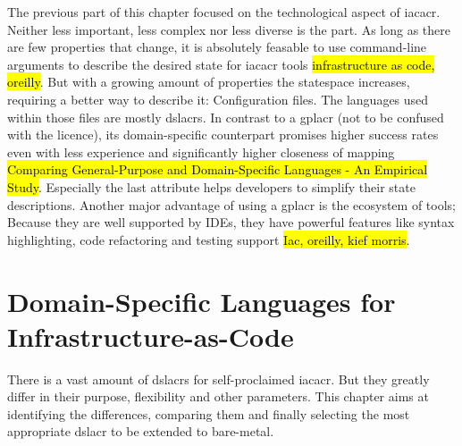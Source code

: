 \newline
The previous part of this chapter focused on the technological  aspect of \gls{iacacr}. Neither less important, less complex nor less diverse is the  part.
\newline
As long as there are few properties that change, it is absolutely feasable to use command-line arguments to describe the desired state for \gls{iacacr} tools \hl{infrastructure as code, oreilly}. But with a growing amount of properties the statespace increases, requiring a better way to describe it: Configuration files. The languages used within those files are mostly \gls{dslacr}s. In contrast to a \gls{gplacr} (not to be confused with the licence), its domain-specific counterpart promises higher success rates even with less experience and significantly higher closeness of mapping \hl{Comparing General-Purpose and Domain-Specific Languages - An Empirical Study}. Especially the last attribute helps developers to simplify their state descriptions. Another major advantage of using a \gls{gplacr} is the ecosystem of tools; Because they are well supported by IDEs, they have powerful features like syntax highlighting, code refactoring and testing support \hl{Iac, oreilly, kief morris}.

\section{Domain-Specific Languages for Infrastructure-as-Code} %
There is a vast amount of \gls{dslacr}s for self-proclaimed \gls{iacacr}. %
But they greatly differ in their purpose, flexibility and other parameters. This chapter aims at identifying the differences, comparing them and finally selecting the most appropriate \gls{dslacr} to be extended to bare-metal.

